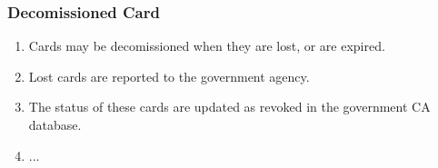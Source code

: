 \subsubsection{Decomissioned Card}

\begin{enumerate}
  \item Cards may be decomissioned when they are lost, or are expired. 
  \item Lost cards are reported to the government agency.
  \item The status of these cards are updated as revoked in the government CA database.
  \item ...
\end{enumerate}
